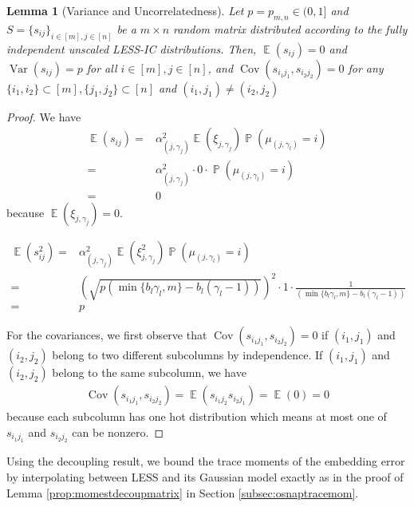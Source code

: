 \documentclass[11pt]{amsart}
\numberwithin{equation}{section}
\numberwithin{equation}{section}
\DeclareMathOperator{\E}{\mathbb{E}}
\DeclareMathOperator{\Pb}{\mathbb{P}}
\DeclareMathOperator{\cov}{Cov}
\newtheorem{lemma}[theorem]{Lemma}
\theoremstyle{remark}
\theoremstyle{definition}
\begin{document}
\begin{lemma}[Variance and Uncorrelatedness] \label{lem:lessvar}
Let $p = p_{m,n} \in (0,1]$ and $S=\{s_{ij}\}_{i \in [m], j \in [n]}$ be a $m \times n$ random matrix distributed according to the fully independent unscaled LESS-IC distributions. Then, $\E(s_{ij})=0$ and $\operatorname{Var}(s_{ij})=p$ for all $i \in [m], j \in [n]$, and $\cov(s_{i_1 j_1},s_{i_2 j_2})=0$ for any $\{i_1,i_2\} \subset [m], \{j_1,j_2\} \subset [n]$ and $ (i_1,j_1)\neq (i_2,j_2) $
\end{lemma}
\begin{proof}
We have
\begin{align*}
    \E (s_{ij}) =& \alpha_{(j, \gamma_j)}^2 \E(\xi_{j,\gamma_j}) \Pb(\mu_{(j, \gamma_l)}=i) \\=&\alpha_{(j, \gamma_j)}^2 \cdot 0 \cdot  \Pb(\mu_{(j, \gamma_l)}=i)
    \\=& 0
\end{align*}
because $\E(\xi_{j,\gamma_j})=0$.

\begin{align*}
    \E (s_{ij}^2) =& \alpha_{(j, \gamma_j)}^2 \E(\xi_{j,\gamma_j}^2) \Pb(\mu_{(j, \gamma_l)}=i) \\=&(\sqrt{p(\min \{ b_l\gamma_l, m \} - b_l(\gamma_l-1))})^2 \cdot 1 \cdot  \frac{1}{(\min \{ b_l\gamma_l, m \} - b_l(\gamma_l-1))}
    \\=& p
\end{align*}


For the covariances, we first observe that $\cov(s_{i_1 j_1}, s_{i_2 j_2})=0$ if $(i_1,j_1)$ and $(i_2,j_2)$ belong to two different subcolumns by independence. If $(i_1,j_1)$ and $(i_2,j_2)$ belong to the same subcolumn, we have
\begin{align*}
    \cov(s_{i_1 j_1}, s_{i_2 j_2})=\E(s_{i_1 j_2}s_{i_2 j_1})=\E(0)=0
\end{align*}
because each subcolumn has one hot distribution which means at most one of $s_{i_1 j_1}$ and $s_{i_2 j_2}$ can be nonzero.

\end{proof}

 Using the decoupling result, we bound the trace moments of the embedding error by interpolating between LESS and its Gaussian model exactly as in the proof of Lemma \ref{prop:momestdecoupmatrix} in Section \ref{subsec:osnaptracemom}.
\end{document}
